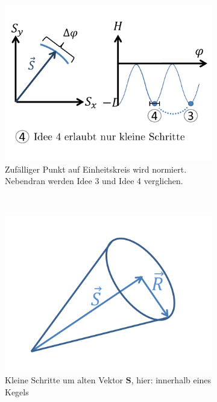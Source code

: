 \documentclass[12pt]{article}
\begin{document}
\begin{enumerate}
\begin{figure}[h] 
		\begin{subfigure}[h]{0.5 \textwidth}
		\centering
		\includegraphics[width=\textwidth]{Folie47.png}
		\caption{Zufälliger Punkt auf Einheitskreis wird normiert. Nebendran werden Idee 3 und Idee 4 verglichen.} 
		\label{fig:zufaellig}
		\centering
	\end{subfigure}
	~
\begin{subfigure}[h]{0.5\textwidth}
		\centering
		\includegraphics[width=\textwidth]{Folie48.png}
		\caption{Kleine Schritte um alten Vektor $\mathbf{S}$, hier: innerhalb eines Kegels}
		\label{fig:Kegel}
		\centering
	\end{subfigure}
	\caption{} %
\end{figure}	



\end{enumerate}
\end{document}
